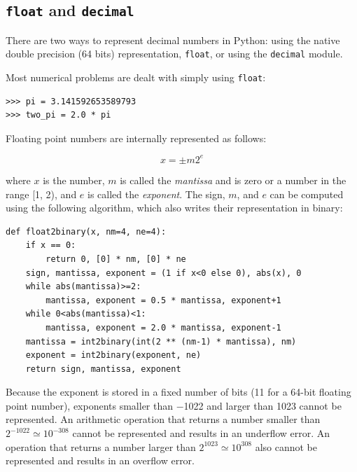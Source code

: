 \documentclass[justified, sixbynine]{tufte-book}
\def\ft{\small\tt}
\theoremstyle{plain}%
\newtheorem * {corollary}{Corollary}
\theoremstyle{definition}
\theoremstyle{remark}
\newtheorem * {remark}{Remark}
\newtheorem * {note}{Note}
\begin{document}
\begin{fullwidth}
\goodbreak\subsection{{\ft float} and {\ft decimal}}


There are two ways to represent decimal numbers in Python: using the native double precision (64 bits) representation, {\ft float}, or using the {\ft decimal} module.

Most numerical problems are dealt with simply using {\ft float}:

\begin{lstlisting}
>>> pi = 3.141592653589793
>>> two_pi = 2.0 * pi
\end{lstlisting}

Floating point numbers are internally represented as follows:

\begin{equation}
x = \pm m 2^e
\end{equation}

where $x$ is the number, $m$ is called the {\it mantissa} and is zero or a number in the range [1, 2), and $e$ is called the {\it exponent}. The sign, $m$, and $e$ can be computed using the following algorithm, which also writes their representation in binary:

\begin{lstlisting}
def float2binary(x, nm=4, ne=4):
    if x == 0:
        return 0, [0] * nm, [0] * ne
    sign, mantissa, exponent = (1 if x<0 else 0), abs(x), 0
    while abs(mantissa)>=2:
        mantissa, exponent = 0.5 * mantissa, exponent+1
    while 0<abs(mantissa)<1:
        mantissa, exponent = 2.0 * mantissa, exponent-1
    mantissa = int2binary(int(2 ** (nm-1) * mantissa), nm)
    exponent = int2binary(exponent, ne)
    return sign, mantissa, exponent
\end{lstlisting}

Because the exponent is stored in a fixed number of bits (11 for a 64-bit floating point number), exponents smaller than $-$1022 and larger than 1023 cannot be represented. An arithmetic operation that returns a number smaller than $2^{-1022} \simeq 10^{-308}$ cannot be represented and results in an underflow error. An operation that returns a number larger than $2^{1023}\simeq 10^{308}$ also cannot be represented and results in an overflow error.


\end{fullwidth}
\end{document}
